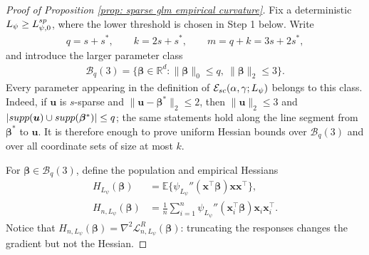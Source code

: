 \documentclass[letterpaper,12pt]{article}
\numberwithin{equation}{section}
\theoremstyle{plain}
\numberwithin{Theorem}{section}
\numberwithin{proposition}{section}
\numberwithin{Lemma}{section}
{
	\theoremstyle{definition}
	\newtheorem{Definition}{Definition}
	\newtheorem{example}{Example}
	\numberwithin{example}{section}
	\newtheorem{fact}{Fact}
	\numberwithin{fact}{section}
	\newtheorem{remark}{Remark}
}
\newcommand{\1}{\mathbbm{1}}
\def\bbeta{{\boldsymbol{\beta}}}
\def\supp{{\rm supp}}
\def\E{\mathbb{E}}
\def\L{{\mathcal L}}
\begin{document}
\begin{proof}[Proof of Proposition \ref{prop: sparse glm empirical curvature}]
Fix a deterministic $L_\psi\geq L_{\psi,0}^{\rm sp}$, where the lower
threshold is chosen in Step 1 below.
Write
\begin{align*}
q=s+s^*,\qquad k=2s+s^*,\qquad m=q+k=3s+2s^*,
\end{align*}
and introduce the larger parameter class
\begin{align*}
\mathcal B_q(3)=\{\bbeta\in\mathbb R^d:
\|\bbeta\|_0\leq q,\ \|\bbeta\|_2\leq3\}.
\end{align*}
Every parameter appearing in the definition of
$\mathcal E_{\rm sc}(\alpha,\gamma;L_\psi)$ belongs to this class.
Indeed, if
$\bm u$ is $s$-sparse and
$\|\bm u-\bbeta^*\|_2\leq2$, then
$\|\bm u\|_2\leq3$ and
$|\supp(\bm u)\cup\supp(\bbeta^*)|\leq q$; the same statements hold
along the line segment from $\bbeta^*$ to $\bm u$.  It is therefore
enough to prove uniform Hessian bounds over $\mathcal B_q(3)$ and over
all coordinate sets of size at most $k$.

For $\bbeta\in\mathcal B_q(3)$, define the population and empirical
Hessians
\begin{align*}
H_{L_\psi}(\bbeta)&=\E\{\psi_{L_\psi}''(\bm x^\top\bbeta)
\bm x\bm x^\top\},\\
H_{n,L_\psi}(\bbeta)&=\frac1n\sum_{i=1}^n
\psi_{L_\psi}''(\bm x_i^\top\bbeta)\bm x_i\bm x_i^\top.
\end{align*}
Notice that
$H_{n,L_\psi}(\bbeta)=\nabla^2\L_{n,L_\psi}^R(\bbeta)$:
truncating the responses changes the gradient but not the Hessian.


\end{proof}
\end{document}
